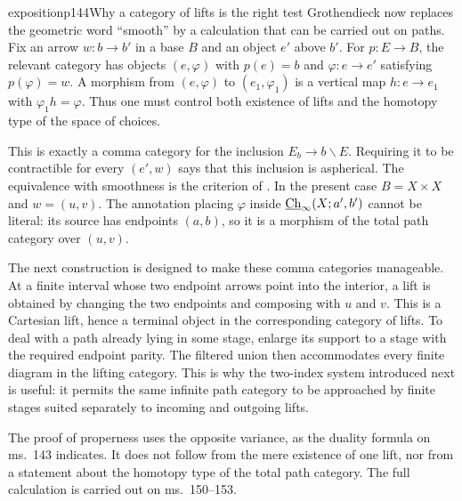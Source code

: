 \begin{dcomment}{exposition}{p144}{Why a category of lifts is the right test}
Grothendieck now replaces the geometric word ``smooth'' by a calculation that can be carried out on paths. Fix an arrow $w:b\to b'$ in a base $B$ and an object $e'$ above $b'$. For $p:E\to B$, the relevant category has objects $(e,\varphi)$ with $p(e)=b$ and $\varphi:e\to e'$ satisfying $p(\varphi)=w$. A morphism from $(e,\varphi)$ to $(e_1,\varphi_1)$ is a vertical map $h:e\to e_1$ with $\varphi_1h=\varphi$. Thus one must control both existence of lifts and the homotopy type of the space of choices.

This is exactly a comma category for the inclusion $E_b\to b\backslash E$. Requiring it to be contractible for every $(e',w)$ says that this inclusion is aspherical. The equivalence with smoothness is the criterion of \citet[Theorem~1.2]{Maltsiniotis2005Asphericite}. In the present case $B=X\times X$ and $w=(u,v)$. The annotation placing $\varphi$ inside $\underline{\mathrm{Ch}}_\infty(X;a',b')$ cannot be literal: its source has endpoints $(a,b)$, so it is a morphism of the total path category over $(u,v)$.

The next construction is designed to make these comma categories manageable. At a finite interval whose two endpoint arrows point into the interior, a lift is obtained by changing the two endpoints and composing with $u$ and $v$. This is a Cartesian lift, hence a terminal object in the corresponding category of lifts. To deal with a path already lying in some stage, enlarge its support to a stage with the required endpoint parity. The filtered union then accommodates every finite diagram in the lifting category. This is why the two-index system introduced next is useful: it permits the same infinite path category to be approached by finite stages suited separately to incoming and outgoing lifts.

The proof of properness uses the opposite variance, as the duality formula on ms.~143 indicates. It does not follow from the mere existence of one lift, nor from a statement about the homotopy type of the total path category. The full calculation is carried out on ms.~150--153.
\end{dcomment}


